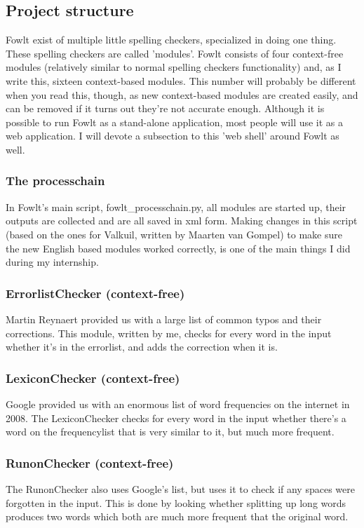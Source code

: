 \documentclass[12pt]{article}
\begin{document}
\subsection{Project structure}
Fowlt exist of multiple little spelling checkers, specialized in doing one thing. These spelling checkers are called 'modules'. Fowlt consists of four context-free modules (relatively similar to normal spelling checkers functionality) and, as I write this, sixteen context-based modules. This number will probably be different when you read this, though, as new context-based modules are created easily, and can be removed if it turns out they're not accurate enough. Although it is possible to run Fowlt as a stand-alone application, most people will use it as a web application. I will devote a subsection to this 'web shell' around Fowlt as well.


\subsubsection{The processchain}
In Fowlt's main script, fowlt\_processchain.py, all modules are started up, their outputs are collected and are all saved in xml form. Making changes in this script (based on the ones for Valkuil, written by Maarten van Gompel) to make sure the new English based modules worked correctly, is one of the main things I did during my internship. 

\subsubsection{ErrorlistChecker (context-free)}
Martin Reynaert provided us with a large list of common typos and their corrections. This module, written by me, checks for every word in the input whether it's in the errorlist, and adds the correction when it is.

\subsubsection{LexiconChecker (context-free)}
Google provided us with an enormous list of word frequencies on the internet in 2008. The LexiconChecker checks for every word in the input whether there's a word on the frequencylist that is very similar to it, but much more frequent.

\subsubsection{RunonChecker (context-free)}
The RunonChecker also uses Google's list, but uses it to check if any spaces were forgotten in the input. This is done by looking whether splitting up long words produces two words which both are much more frequent that the original word.
\end{document}
